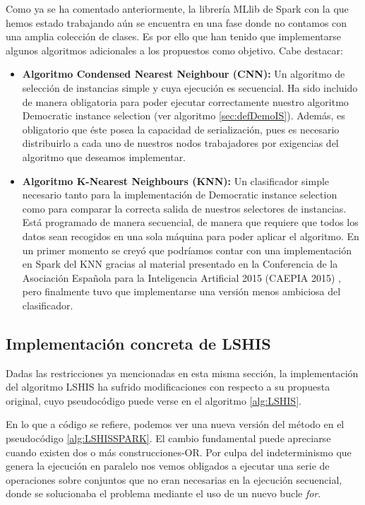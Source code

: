Como ya se ha comentado anteriormente, la librería MLlib de Spark con la que hemos estado trabajando aún se encuentra en una fase donde no contamos con una amplia colección de clases. Es por ello que han tenido que implementarse algunos algoritmos adicionales a los propuestos como objetivo. Cabe destacar:

\begin{itemize}
\item \textbf{Algoritmo Condensed Nearest Neighbour (CNN):} Un algoritmo de selección de instancias simple y cuya ejecución es secuencial. Ha sido incluido de manera obligatoria para poder ejecutar correctamente nuestro algoritmo Democratic instance selection (ver algoritmo \ref{sec:defDemoIS}). Además, es obligatorio que éste posea la capacidad de serialización, pues es necesario distribuirlo a cada uno de nuestros nodos trabajadores por exigencias del algoritmo que deseamos implementar.
\item  \textbf{Algoritmo K-Nearest Neighbours (KNN):} Un clasificador simple necesario tanto para la implementación de Democratic instance selection como para comparar la correcta salida de nuestros selectores de instancias. Está programado de manera secuencial, de manera que requiere que todos los datos sean recogidos en una sola máquina para poder aplicar el algoritmo. En un primer momento se creyó que podríamos contar con una implementación en Spark del KNN gracias al material presentado en la Conferencia de la Asociación Española para la Inteligencia Artificial 2015 (CAEPIA 2015) \cite{KNNConferencia}, pero finalmente tuvo que implementarse una versión menos ambiciosa del clasificador.
\end{itemize}


\subsection{Implementación concreta de LSHIS}

Dadas las restricciones ya mencionadas en esta misma sección, la implementación del algoritmo LSHIS ha sufrido modificaciones con respecto a su propuesta original, cuyo pseudocódigo puede verse en el algoritmo \ref{alg:LSHIS}.

En lo que a código se refiere, podemos ver una nueva versión del método en el pseudocódigo \ref{alg:LSHISSPARK}. El cambio fundamental puede apreciarse cuando existen dos o más construcciones-OR. Por culpa del indeterminismo que genera la ejecución en paralelo nos vemos obligados a ejecutar una serie de operaciones sobre conjuntos que no eran necesarias en la ejecución secuencial, donde se solucionaba el problema mediante el uso de un nuevo bucle \textit{for}.

